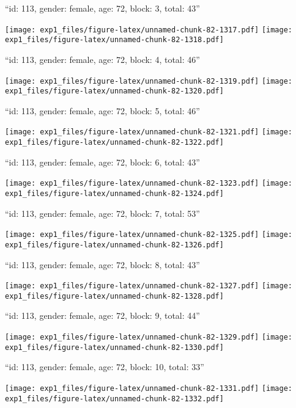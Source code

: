 \documentclass[11pt,,]{article}
\begin{document}
\newpage
[1] 

``id: 113, gender: female, age: 72, block: 3, total: 43''

\texttt{[image: exp1\_files/figure-latex/unnamed-chunk-82-1317.pdf]}
\texttt{[image: exp1\_files/figure-latex/unnamed-chunk-82-1318.pdf]}

\newpage
[1] 

``id: 113, gender: female, age: 72, block: 4, total: 46''

\texttt{[image: exp1\_files/figure-latex/unnamed-chunk-82-1319.pdf]}
\texttt{[image: exp1\_files/figure-latex/unnamed-chunk-82-1320.pdf]}

\newpage
[1] 

``id: 113, gender: female, age: 72, block: 5, total: 46''

\texttt{[image: exp1\_files/figure-latex/unnamed-chunk-82-1321.pdf]}
\texttt{[image: exp1\_files/figure-latex/unnamed-chunk-82-1322.pdf]}

\newpage
[1] 

``id: 113, gender: female, age: 72, block: 6, total: 43''

\texttt{[image: exp1\_files/figure-latex/unnamed-chunk-82-1323.pdf]}
\texttt{[image: exp1\_files/figure-latex/unnamed-chunk-82-1324.pdf]}

\newpage
[1] 

``id: 113, gender: female, age: 72, block: 7, total: 53''

\texttt{[image: exp1\_files/figure-latex/unnamed-chunk-82-1325.pdf]}
\texttt{[image: exp1\_files/figure-latex/unnamed-chunk-82-1326.pdf]}

\newpage
[1] 

``id: 113, gender: female, age: 72, block: 8, total: 43''

\texttt{[image: exp1\_files/figure-latex/unnamed-chunk-82-1327.pdf]}
\texttt{[image: exp1\_files/figure-latex/unnamed-chunk-82-1328.pdf]}

\newpage
[1] 

``id: 113, gender: female, age: 72, block: 9, total: 44''

\texttt{[image: exp1\_files/figure-latex/unnamed-chunk-82-1329.pdf]}
\texttt{[image: exp1\_files/figure-latex/unnamed-chunk-82-1330.pdf]}

\newpage
[1] 

``id: 113, gender: female, age: 72, block: 10, total: 33''

\texttt{[image: exp1\_files/figure-latex/unnamed-chunk-82-1331.pdf]}
\texttt{[image: exp1\_files/figure-latex/unnamed-chunk-82-1332.pdf]}
\end{document}
